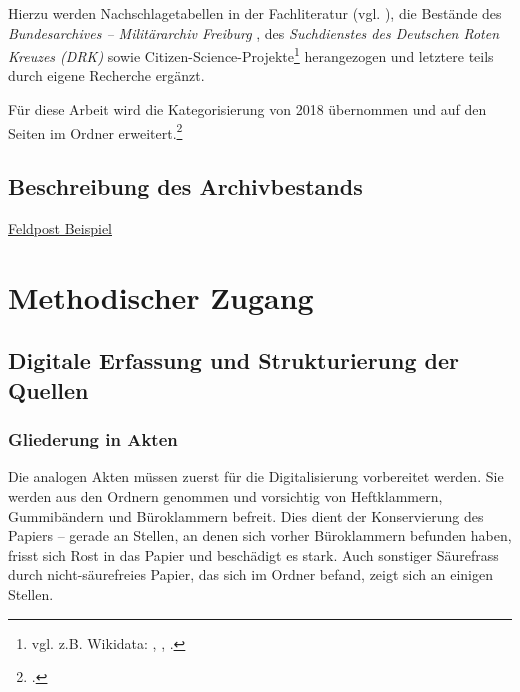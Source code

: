 \documentclass[12pt, a4paper, ngerman, bidi=default]{article}
\let\cite\footcite
\begin{document}
Hierzu werden Nachschlagetabellen in der Fachliteratur (vgl. \autocites{tessin_verbande_1977}{hartmann_wehrmacht_2010}{rass_deutsche_2009}), die Bestände des \textit{Bundesarchives – Militärarchiv Freiburg} \autocite{hollmann_freiburg_2025}, des \textit{Suchdienstes des Deutschen Roten Kreuzes (DRK)} \autocite{reuter_drk_2025} sowie Citizen-Science-Projekte\footnote{ vgl. z.B. Wikidata: \autocite{burkhardt_78th_2024}, \autocite{altenburger_lexikon_nodate-1}, \autocite{hermans_forum_nodate}.} herangezogen und letztere teils durch eigene Recherche ergänzt.


Für diese Arbeit wird die Kategorisierung von 2018 übernommen und auf den Seiten im Ordner erweitert.\cite[vgl.][]{burkhardt_githubakten_gesamtubersichtcsv_2025} 

\subsection{Beschreibung des Archivbestands}
\newpage

\href{https://free.iiifhosting.com/iiif/959173f8d808ab12ad7847917f79e0e4bc974ebce0040a07afd4b8be3f10c234/}{Feldpost Beispiel}

    
\section{Methodischer Zugang}
    
    \subsection{Digitale Erfassung und Strukturierung der Quellen}
    \subsubsection{Gliederung in Akten}

    Die analogen Akten müssen zuerst für die Digitalisierung vorbereitet werden. Sie werden aus den Ordnern genommen und vorsichtig von Heftklammern, 
    Gummibändern und Büroklammern befreit. Dies dient der Konservierung des Papiers – gerade an Stellen, an denen sich vorher Büroklammern befunden haben, 
    frisst sich Rost in das Papier und beschädigt es stark. Auch sonstiger Säurefrass durch nicht-säurefreies Papier, das sich im Ordner befand, zeigt sich an einigen Stellen.\\
\end{document}
